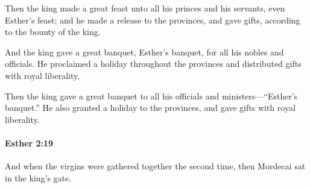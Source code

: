 			\begin{versebox}
					\item[BHS] 
					\item[LXX] 
					\item[ASV] Then the king made a great feast unto all his princes and his servants, even Esther's feast; and he made a release to the provinces, and gave gifts, according to the bounty of the king.
					\item[NIV] And the king gave a great banquet, Esther’s banquet, for all his nobles and officials. He proclaimed a holiday throughout the provinces and distributed gifts with royal liberality.
					\item[NRSV] Then the king gave a great banquet to all his officials and ministers—“Esther’s banquet.” He also granted a holiday to the provinces, and gave gifts with royal liberality.
			\end{versebox}

		\paragraph{Esther 2:19} %
			\label{ESTHER-2-19}

			And when the virgins were gathered together the second time, then Mordecai sat in the king’s gate.

